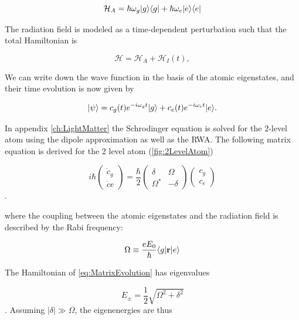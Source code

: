 \begin{equation}\label{eq:AtomHamiltonianMain}
	\mathcal{H}_A = \hbar \omega_g \lvert g\rangle\langle g\rvert + \hbar \omega_e \lvert e\rangle\langle e\rvert
\end{equation}

The radiation field is modeled as a time-dependent perturbation such that the total Hamiltonian is \cite{Leeuwen2017}

\begin{equation}\label{eq:PerturbationMain}
	\mathcal{H} = \mathcal{H}_A + \mathcal{H}_{I}(t),
\end{equation}

We can write down the wave function in the basis of the atomic eigenstates, and their time evolution is now given by

\begin{equation}\label{eq:TwoLevelMain}
	\lvert\psi\rangle = c_g(t) e^{-i \omega_g t} \lvert g\rangle + c_e(t) e^{-i \omega_e t} \lvert e\rangle.
\end{equation}

In appendix \ref{ch:LightMatter} the Schrodinger equation is solved for the 2-level atom using the dipole approximation as well as the \acf*{RWA}. The following matrix equation is derived for the 2 level atom (\cref{fig:2LevelAtom}) \cite{Foot2005}

\begin{equation}\label{eq:MatrixEvolution}
	i \hbar \begin{pmatrix}
		\dot{c}_g \\ 
		\dot{c}e
	\end{pmatrix}
	= \frac{\hbar}{2} \begin{pmatrix}
		\delta & \Omega \\ \Omega^* & -\delta 
	\end{pmatrix} 
	\begin{pmatrix}
		c_g \\ c_e
	\end{pmatrix}
\end{equation}.

where the coupling between the atomic eigenstates and the radiation field is described by the Rabi frequency:

\begin{equation}\label{eq:RabiFrequencyMain}
	\Omega \equiv \frac{e E_0}{\hbar} \langle g\rvert\mathbf{r}\lvert e\rangle
\end{equation}

The Hamiltonian of \cref{eq:MatrixEvolution} has eigenvalues 

\begin{equation}\label{eq:EigenValues}
	E_{\pm} = 
	\frac{1}{2} \sqrt{\Omega^2+\delta^2}
\end{equation}. Assuming $|\delta| \gg \Omega$, the eigenenergies are thus 

